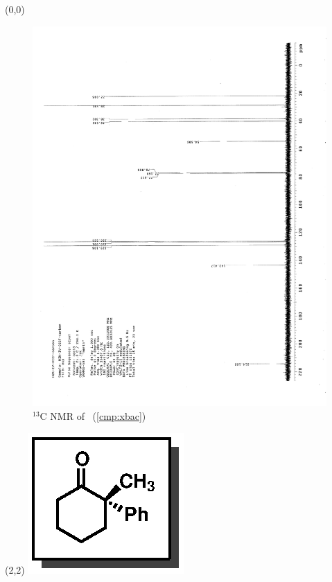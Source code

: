 \clearpage
\begin{textblock}{20}(0,0)
\begin{figure}[htb]
\caption{$^{13}$C NMR of  \CMPxbac\ (\ref{cmp:xbac})}
\includegraphics[scale=0.75, trim = 0mm 0mm 0mm 5mm,
clip]{chp_singlecarbon/images/nmr/xbacC}
\vspace{-100pt}
\end{figure}
\end{textblock}
\begin{textblock}{1}(2,2)
\includegraphics[scale=0.8, angle=90]{chp_singlecarbon/images/xbac}
\end{textblock}
\clearpage


